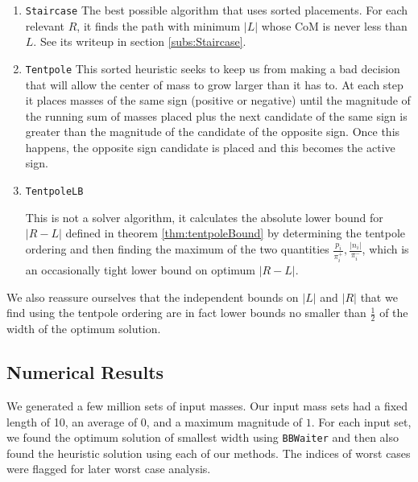 \begin{enumerate}
\item \texttt{Staircase} The best possible algorithm that uses sorted placements. For each relevant $R$, it finds the path with minimum $|L|$ whose CoM is never less than $L$.   See its writeup in section \ref{subs:Staircase}.

\item \texttt{Tentpole}
This sorted heuristic seeks to keep us from making a bad decision that will allow the center of mass to grow larger than it has to.  At each step it places masses of the same sign (positive or negative) until the magnitude of the running sum of masses placed plus the next candidate of the same sign is greater than the magnitude of the candidate of the opposite sign.  Once this happens, the opposite sign candidate is placed and this becomes the active sign.


\item \texttt{TentpoleLB}

This is not a solver algorithm, it calculates the absolute lower bound for $|R-L|$ defined in theorem \ref{thm:tentpoleBound} by determining the tentpole ordering and then finding the maximum of the two quantities $\frac{p_i}{\pi^+_i},\frac{|n_i|}{\pi^-_i}$, which is an occasionally tight lower bound on optimum $|R-L|$.

\end{enumerate}

We also reassure ourselves that the independent bounds on $|L|$ and $|R|$ that we find using the tentpole ordering are in fact lower bounds no smaller than $\frac12$ of the width of the optimum solution.

\subsection{Numerical Results}

We generated a few million sets of input masses.  Our input mass sets had a fixed length of 10, an average of 0, and a maximum magnitude of $1$.  For each input set, we found the optimum solution of smallest width using \texttt{BBWaiter} and then also found the heuristic solution using each of our methods.  The indices of worst cases were flagged for later worst case analysis. 


